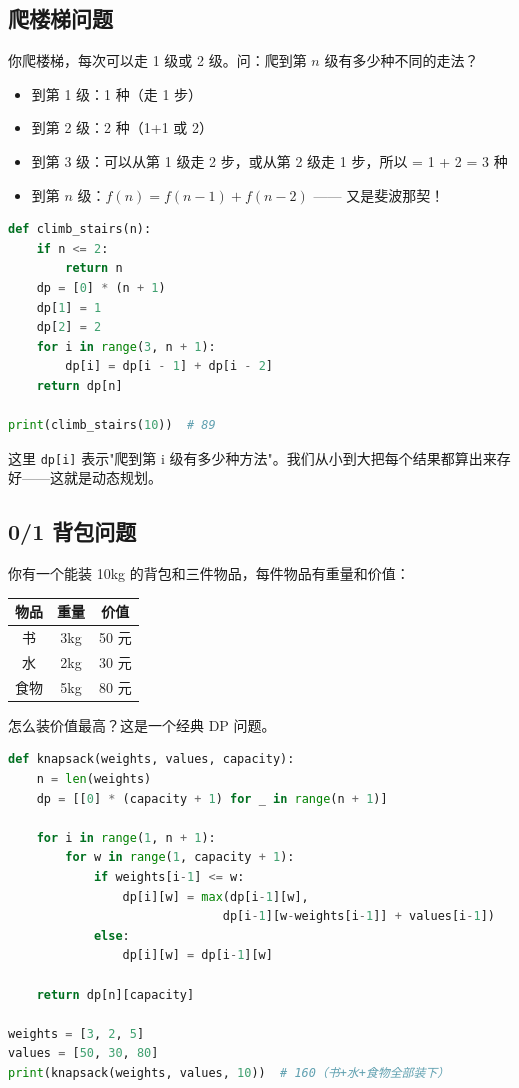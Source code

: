 \documentclass[a4paper,12pt]{ctexart}
\begin{document}
\subsection*{爬楼梯问题}

你爬楼梯，每次可以走 1 级或 2 级。问：爬到第 $n$ 级有多少种不同的走法？

\begin{itemize}
  \item 到第 1 级：1 种（走 1 步）
  \item 到第 2 级：2 种（1+1 或 2）
  \item 到第 3 级：可以从第 1 级走 2 步，或从第 2 级走 1 步，所以 = 1 + 2 = 3 种
  \item 到第 $n$ 级：$f(n) = f(n-1) + f(n-2)$ —— 又是斐波那契！
\end{itemize}

\begin{lstlisting}[language=Python]
def climb_stairs(n):
    if n <= 2:
        return n
    dp = [0] * (n + 1)
    dp[1] = 1
    dp[2] = 2
    for i in range(3, n + 1):
        dp[i] = dp[i - 1] + dp[i - 2]
    return dp[n]

print(climb_stairs(10))  # 89
\end{lstlisting}

这里 \texttt{dp[i]} 表示"爬到第 i 级有多少种方法"。我们从小到大把每个结果都算出来存好——这就是动态规划。

\subsection*{0/1 背包问题}

你有一个能装 10kg 的背包和三件物品，每件物品有重量和价值：

\begin{center}
\begin{tabular}{|c|c|c|}
\hline
\textbf{物品} & \textbf{重量} & \textbf{价值} \\ \hline
书 & 3kg & 50 元 \\ \hline
水 & 2kg & 30 元 \\ \hline
食物 & 5kg & 80 元 \\ \hline
\end{tabular}
\end{center}

怎么装价值最高？这是一个经典 DP 问题。

\begin{lstlisting}[language=Python]
def knapsack(weights, values, capacity):
    n = len(weights)
    dp = [[0] * (capacity + 1) for _ in range(n + 1)]
    
    for i in range(1, n + 1):
        for w in range(1, capacity + 1):
            if weights[i-1] <= w:
                dp[i][w] = max(dp[i-1][w], 
                              dp[i-1][w-weights[i-1]] + values[i-1])
            else:
                dp[i][w] = dp[i-1][w]
    
    return dp[n][capacity]

weights = [3, 2, 5]
values = [50, 30, 80]
print(knapsack(weights, values, 10))  # 160（书+水+食物全部装下）
\end{lstlisting}
\end{document}
